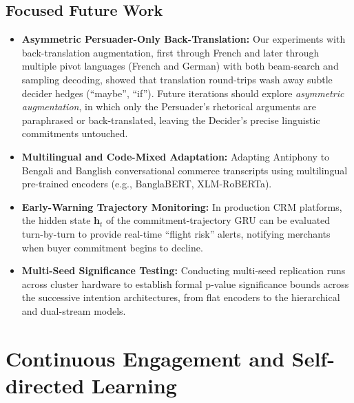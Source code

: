 \subsection{Focused Future Work}
\begin{itemize}
  \item \textbf{Asymmetric Persuader-Only Back-Translation:} Our experiments with back-translation augmentation, first through French and later through multiple pivot languages (French and German) with both beam-search and sampling decoding, showed that translation round-trips wash away subtle decider hedges (``maybe'', ``if''). Future iterations should explore \textit{asymmetric augmentation}, in which only the Persuader's rhetorical arguments are paraphrased or back-translated, leaving the Decider's precise linguistic commitments untouched.
  \item \textbf{Multilingual and Code-Mixed Adaptation:} Adapting Antiphony to Bengali and Banglish conversational commerce transcripts using multilingual pre-trained encoders (e.g., BanglaBERT, XLM-RoBERTa).
  \item \textbf{Early-Warning Trajectory Monitoring:} In production CRM platforms, the hidden state $\mathbf{h}_t$ of the commitment-trajectory GRU can be evaluated turn-by-turn to provide real-time ``flight risk'' alerts, notifying merchants when buyer commitment begins to decline.
  \item \textbf{Multi-Seed Significance Testing:} Conducting multi-seed replication runs across cluster hardware to establish formal p-value significance bounds across the successive intention architectures, from flat encoders to the hierarchical and dual-stream models.
\end{itemize}

\section{Continuous Engagement and Self-directed Learning}
\label{sec:lessons}

